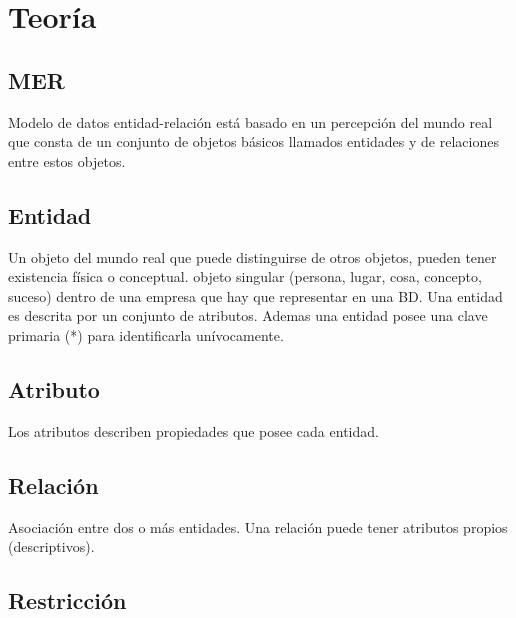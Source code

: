\documentclass{templateNote}
\begin{document}
\portada 
\margenes %

\section{Teoría}
\subsection{MER}
\indent
Modelo de datos entidad-relación está basado en un percepción del mundo real que consta de un conjunto de objetos
básicos llamados entidades y de relaciones entre estos objetos.

\subsection{Entidad}
\indent
Un objeto del mundo real que puede distinguirse de otros objetos, pueden tener existencia física o conceptual.
objeto singular (persona, lugar, cosa, concepto, suceso) dentro de una empresa que hay que representar
en una BD. Una entidad es descrita por un conjunto de atributos. Ademas una entidad posee una clave primaria (*) para 
identificarla unívocamente.


\subsection{Atributo}
\indent
Los atributos describen propiedades que posee cada entidad.

\subsection{Relación}
\indent
Asociación entre dos o más entidades. Una relación puede tener atributos propios (descriptivos).


\newpage
\subsection{Restricción}
\end{document}
